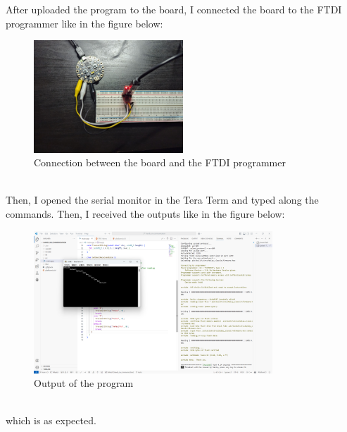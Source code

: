 \documentclass{article}
\begin{document}
After uploaded the program to the board, I connected the board to the FTDI programmer like in the figure below:
\begin{figure}[h]
    \centering
    \includegraphics[width=0.5\textwidth]{pic1.png}
    \caption{Connection between the board and the FTDI programmer}
\end{figure}\\
Then, I opened the serial monitor in the Tera Term and typed along the commands. Then, I received the outputs like in the figure below:
\begin{figure}[h]
    \centering
    \includegraphics[width=0.8\textwidth]{pic2.png}
    \caption{Output of the program}
\end{figure} \\
which is as expected. 
\end{document}
